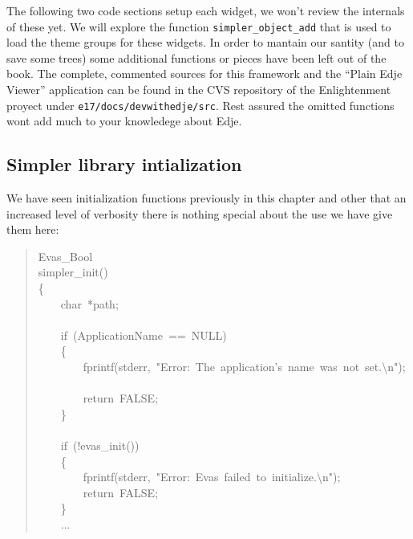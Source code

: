 \documentclass[12pt,a4paper,english]{book}
\begin{document}
The following two code sections setup each widget, we won't review the
internals of these yet. We will explore the function \texttt{simpler{\_}object{\_}add}
that is used to load the theme groups for these widgets. In order to mantain
our santity (and to save some trees) some additional functions or pieces have
been left out of the book. The complete, commented sources for this framework
and the ``Plain Edje Viewer'' application can be found in the CVS repository of
the Enlightenment proyect under \texttt{e17/docs/devwithedje/src}. Rest assured the
omitted functions wont add much to your knowledege about Edje.



\hypertarget{simpler-library-intialization}{}
\subsection{Simpler library intialization}
\label{simpler-library-intialization}

We have seen initialization functions previously in this chapter and other that
an increased level of verbosity there is nothing special about the use we have
give them here:
\begin{quote}{\ttfamily \raggedright \noindent
Evas{\_}Bool~\\
simpler{\_}init()~\\
{\{}~\\
~~~~char~*path;~\\
~\\
~~~~if~(ApplicationName~==~NULL)~\\
~~~~{\{}~\\
~~~~~~~~fprintf(stderr,~"Error:~The~application's~name~was~not~set.{\textbackslash}n");~\\
~~~~~~~~return~FALSE;~\\
~~~~{\}}~\\
~\\
~~~~if~(!evas{\_}init())~\\
~~~~{\{}~\\
~~~~~~~~fprintf(stderr,~"Error:~Evas~failed~to~initialize.{\textbackslash}n");~\\
~~~~~~~~return~FALSE;~\\
~~~~{\}}~\\
~~~~...
}\end{quote}
\end{document}
